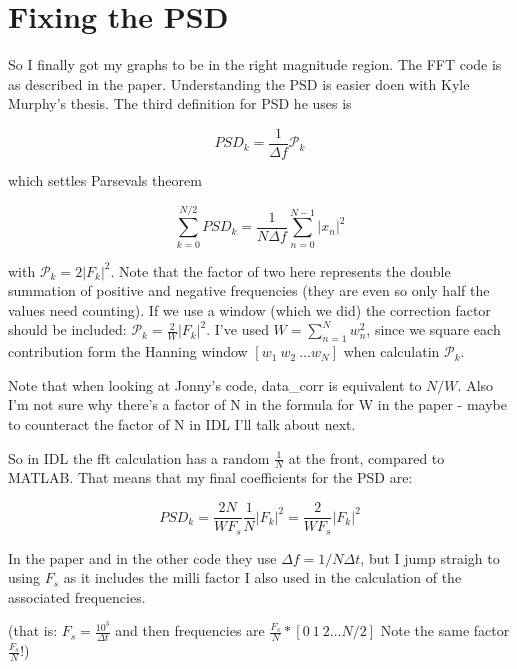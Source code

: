 \documentclass[11pt]{article}
\begin{document}
\section{Fixing the PSD}
So I finally got my graphs to be in the right magnitude region. The FFT code is as described in
the paper. Understanding the PSD is easier doen with Kyle Murphy's thesis. The third definition for
PSD he uses is 

\begin{equation}
    PSD_k = \frac{1}{\Delta f} \mathcal{P}_k
\end{equation}

which settles Parsevals theorem

\begin{equation}
    \sum_{k = 0}^{N/2} PSD_k = \frac{1}{N \Delta f} \sum_{n = 0}^{N - 1} \left| x_n \right| ^2
\end{equation}

with $\mathcal{P}_k = 2 \left| F_k \right| ^2$. Note that the factor of two here represents the
double summation of positive and negative frequencies (they are even so only half the values need
counting). If we use a window (which we did) the correction factor should be included:
$\mathcal{P}_k = \frac{2}{W} \left| F_k \right| ^2$. I've used $W = \sum_{n= 1}^{N} w_n^2$, since
we square each contribution form the Hanning window $[ w_1 \  w_2 \ \ldots w_N ]$ when calculatin
$\mathcal{P}_k$. 

Note that when looking at Jonny's code, data\_corr is equivalent to $N/W$. Also I'm not sure why
there's a factor of N in the formula for W in the paper - maybe to counteract the factor of N in
IDL I'll talk about next.

So in IDL the fft calculation has a random $\frac{1}{N}$ at the front, compared to MATLAB. That
means that my final coefficients for the PSD are:

\begin{equation}
    PSD_k = \frac{2 N}{W F_s} \frac{1}{N} \left| F_k \right|^2 = \frac{2}{W F_s} \left| F_k
    \right|^2
\end{equation}

In the paper and in the other code they use $\Delta f = 1/N \Delta t$, but I jump straigh to
using $F_s$ as it includes the milli factor I also used in the calculation of the associated
frequencies.

(that is: $F_s = \frac{10^3}{\Delta t}$ and then frequencies are $\frac{F_s}{N}*[0 \ 1 \ 2 \ldots N/2]$
Note the same factor $\frac{F_s}{N}$!)
\end{document}
